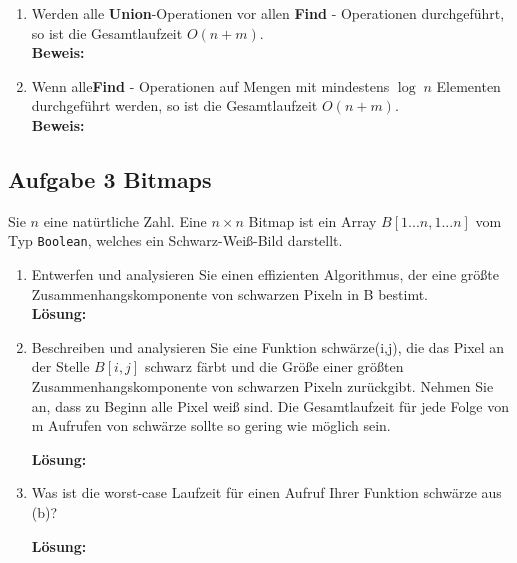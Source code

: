 \documentclass[11pt,a4paper,ngerman]{article}
\begin{document}
\begin{enumerate}[\bfseries (a)]

\item Werden alle \textbf{Union}-Operationen vor allen \textbf{Find} - Operationen durchgeführt, so ist die Gesamtlaufzeit $O(n + m)$.\\

\textbf{Beweis:}\\

\item Wenn alle\textbf{Find} - Operationen auf Mengen mit mindestens $\log \; n$ Elementen durchgeführt werden, so ist die Gesamtlaufzeit $O(n + m)$.\\

\textbf{Beweis:}\\

\end{enumerate}

\subsection*{Aufgabe 3 \mdseries Bitmaps}

Sie $n$ eine natürtliche Zahl. Eine $ n \times n $ Bitmap ist ein Array $B[1 ... n, 1 ... n]$ vom Typ \texttt{Boolean}, welches ein Schwarz-Weiß-Bild darstellt.

\begin{enumerate}[\bfseries (a)]

\item Entwerfen und analysieren Sie einen effizienten Algorithmus, der eine größte Zusammenhangskomponente von schwarzen Pixeln in B bestimt.\\

\textbf{Lösung:}

\item Beschreiben und analysieren Sie eine Funktion schwärze(i,j), die das Pixel an der Stelle $B[i,j]$ schwarz färbt und die Größe einer größten Zusammenhangskomponente von schwarzen Pixeln zurückgibt. Nehmen Sie an, dass zu Beginn alle Pixel weiß sind. Die Gesamtlaufzeit für jede Folge von m Aufrufen von schwärze sollte so gering wie möglich sein.

\textbf{Lösung:}

\item Was ist die worst-case Laufzeit für einen Aufruf Ihrer Funktion schwärze aus (b)?

\textbf{Lösung:}

\end{enumerate}
\end{document}
